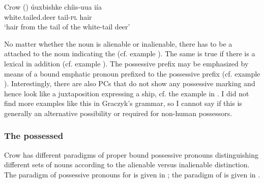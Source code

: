 \documentclass[output=paper]{LSP/langsci}
\begin{document}
\ea {}Crow (\citealt[236]{Graczyk2007}) \label{crowdeer}
\ex 
\gll úuxbishke            chíis-uua iía \\
white.tailed.deer tail-\textsc{pl}      hair \\
\glt `hair from the tail of the white-tail deer'
\z \z

No matter whether the  noun is alienable or inalienable, there has to be a  attached to the  noun indicating the  (cf. example ). The same is true if there is a lexical  in addition (cf. example ). The possessive prefix may be emphasized by means of a bound emphatic pronoun prefixed to the possessive prefix (cf. example ). Interestingly, there are also PCs that do not show any possessive marking and hence look like a juxtaposition expressing a ship, cf. the example in . I did not find more examples like this in Graczyk's grammar, so I cannot say if this is generally an alternative possibility or required for non-human possessors.

\subsubsection{The possessed}
Crow has different paradigms of proper bound possessive pronouns distinguishing different sets of  nouns according to the alienable versus inalienable distinction. The paradigm of possessive pronouns for  is given in ; the paradigm of  is given in .
\end{document}
